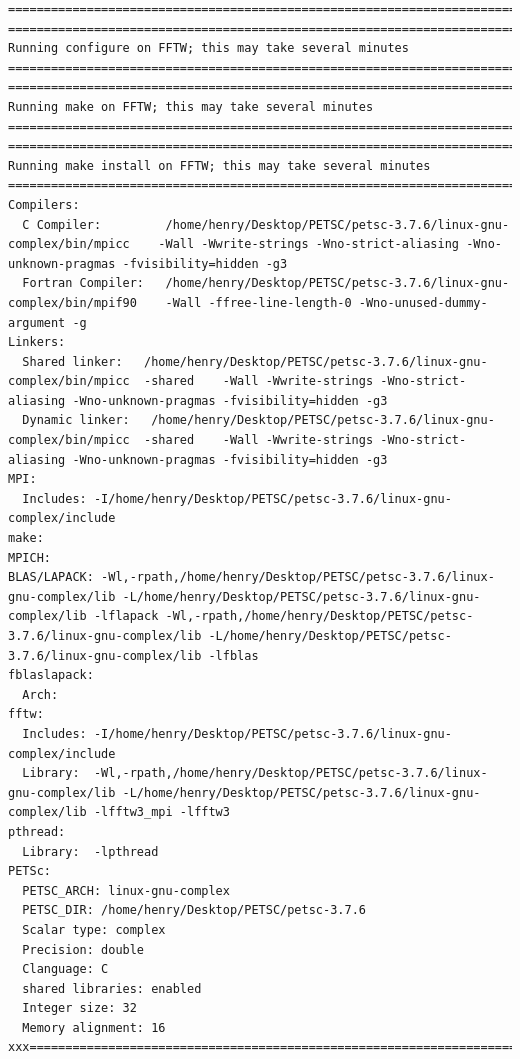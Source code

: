\documentclass{article}
\begin{document}
\begin{enumerate}
\begin{verbatim}
===============================================================================
===============================================================================
Running configure on FFTW; this may take several minutes
===============================================================================
===============================================================================
Running make on FFTW; this may take several minutes
===============================================================================
===============================================================================
Running make install on FFTW; this may take several minutes
===============================================================================
Compilers:                                                                                                                                                                                                          
  C Compiler:         /home/henry/Desktop/PETSC/petsc-3.7.6/linux-gnu-complex/bin/mpicc    -Wall -Wwrite-strings -Wno-strict-aliasing -Wno-unknown-pragmas -fvisibility=hidden -g3 
  Fortran Compiler:   /home/henry/Desktop/PETSC/petsc-3.7.6/linux-gnu-complex/bin/mpif90    -Wall -ffree-line-length-0 -Wno-unused-dummy-argument -g 
Linkers:
  Shared linker:   /home/henry/Desktop/PETSC/petsc-3.7.6/linux-gnu-complex/bin/mpicc  -shared    -Wall -Wwrite-strings -Wno-strict-aliasing -Wno-unknown-pragmas -fvisibility=hidden -g3
  Dynamic linker:   /home/henry/Desktop/PETSC/petsc-3.7.6/linux-gnu-complex/bin/mpicc  -shared    -Wall -Wwrite-strings -Wno-strict-aliasing -Wno-unknown-pragmas -fvisibility=hidden -g3
MPI:
  Includes: -I/home/henry/Desktop/PETSC/petsc-3.7.6/linux-gnu-complex/include
make:
MPICH:
BLAS/LAPACK: -Wl,-rpath,/home/henry/Desktop/PETSC/petsc-3.7.6/linux-gnu-complex/lib -L/home/henry/Desktop/PETSC/petsc-3.7.6/linux-gnu-complex/lib -lflapack -Wl,-rpath,/home/henry/Desktop/PETSC/petsc-3.7.6/linux-gnu-complex/lib -L/home/henry/Desktop/PETSC/petsc-3.7.6/linux-gnu-complex/lib -lfblas
fblaslapack:
  Arch:     
fftw:
  Includes: -I/home/henry/Desktop/PETSC/petsc-3.7.6/linux-gnu-complex/include
  Library:  -Wl,-rpath,/home/henry/Desktop/PETSC/petsc-3.7.6/linux-gnu-complex/lib -L/home/henry/Desktop/PETSC/petsc-3.7.6/linux-gnu-complex/lib -lfftw3_mpi -lfftw3
pthread:
  Library:  -lpthread
PETSc:
  PETSC_ARCH: linux-gnu-complex
  PETSC_DIR: /home/henry/Desktop/PETSC/petsc-3.7.6
  Scalar type: complex
  Precision: double
  Clanguage: C
  shared libraries: enabled
  Integer size: 32
  Memory alignment: 16
xxx=========================================================================xxx

\end{verbatim}
\end{enumerate}
\end{document}
